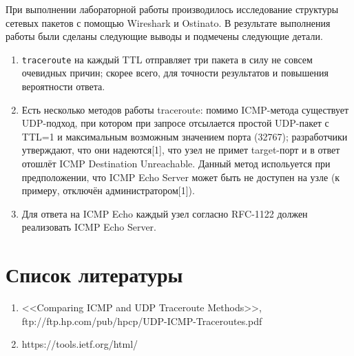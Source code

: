 \documentclass[12pt, a4paper] {ncc}
\begin{document}
При выполнении лабораторной работы производилось исследование структуры сетевых пакетов с помощью Wireshark и Ostinato.
В результате выполнения работы были сделаны следующие выводы и подмечены следующие детали. 
\begin{enumerate}
	\item \texttt{traceroute} на каждый TTL отправляет три пакета в силу не совсем очевидных причин;
		  скорее всего, для точности результатов и повышения вероятности ответа.
	\item Есть несколько методов работы traceroute: помимо ICMP-метода существует UDP-подход, при котором
		  при запросе отсылается простой UDP-пакет с TTL=1 и максимальным возможным значением порта (32767);
		  разработчики утверждают, что они надеются[1], что узел не примет target-порт и в ответ отошлёт
		  ICMP Destination Unreachable. Данный метод испольуется при предположении, что ICMP Echo Server
		  может быть не доступен на узле (к примеру, отключён администратором[1]).
	\item Для ответа на ICMP Echo каждый узел согласно RFC-1122 должен реализовать ICMP Echo Server.
\end{enumerate}

\section*{Список литературы}
\begin{enumerate}
	\item <<Comparing ICMP and  UDP Traceroute Methods>>, ftp://ftp.hp.com/pub/hpcp/UDP-ICMP-Traceroutes.pdf
	\item https://tools.ietf.org/html/
\end{enumerate}
\end{document}
